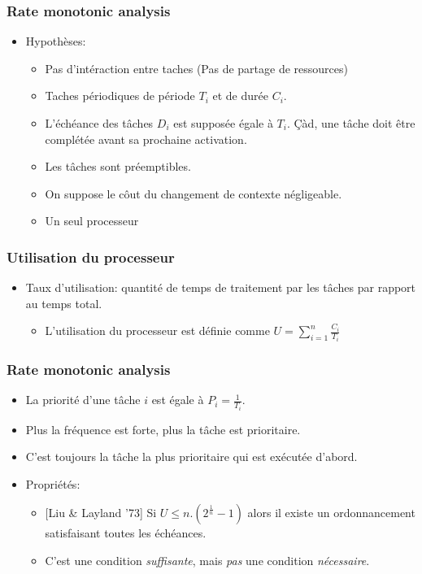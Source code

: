 \documentclass[ignorenonframetext,]{beamer}
\begin{document}
\begin{frame}\frametitle{Rate monotonic analysis}

\begin{itemize}
\item
  Hypothèses:

  \begin{itemize}
  \item
    Pas d'intéraction entre taches (Pas de partage de ressources)
  \item
    Taches périodiques de période $T_i$ et de durée $C_i$.
  \item
    L'échéance des tâches $D_i$ est supposée égale à $T_i$. Çàd, une
    tâche doit être complétée avant sa prochaine activation.
  \item
    Les tâches sont préemptibles.
  \item
    On suppose le côut du changement de contexte négligeable.
  \item
    Un seul processeur
  \end{itemize}
\end{itemize}

\end{frame}

\begin{frame}\frametitle{Utilisation du processeur}

\begin{itemize}
\item
  Taux d'utilisation: quantité de temps de traitement par les tâches par
  rapport au temps total.

  \begin{itemize}
  \item
    L'utilisation du processeur est définie comme
    $U = \sum_{i=1}^n \frac{C_i}{T_i}$
  \end{itemize}
\end{itemize}

\end{frame}

\begin{frame}\frametitle{Rate monotonic analysis}

\begin{itemize}
\item
  La priorité d'une tâche $i$ est égale à $P_i = \frac{1}{T_i}$.
\item
  Plus la fréquence est forte, plus la tâche est prioritaire.
\item
  C'est toujours la tâche la plus prioritaire qui est exécutée d'abord.
\item
  Propriétés:

  \begin{itemize}
  \item
    {[}Liu \& Layland '73{]} Si $U \leq n.(2^{\frac{1}{n}} - 1)$ alors
    il existe un ordonnancement satisfaisant toutes les échéances.
  \item
    C'est une condition \emph{suffisante}, mais \emph{pas} une condition
    \emph{nécessaire}.
  \end{itemize}
\end{itemize}

\end{frame}
\end{document}
